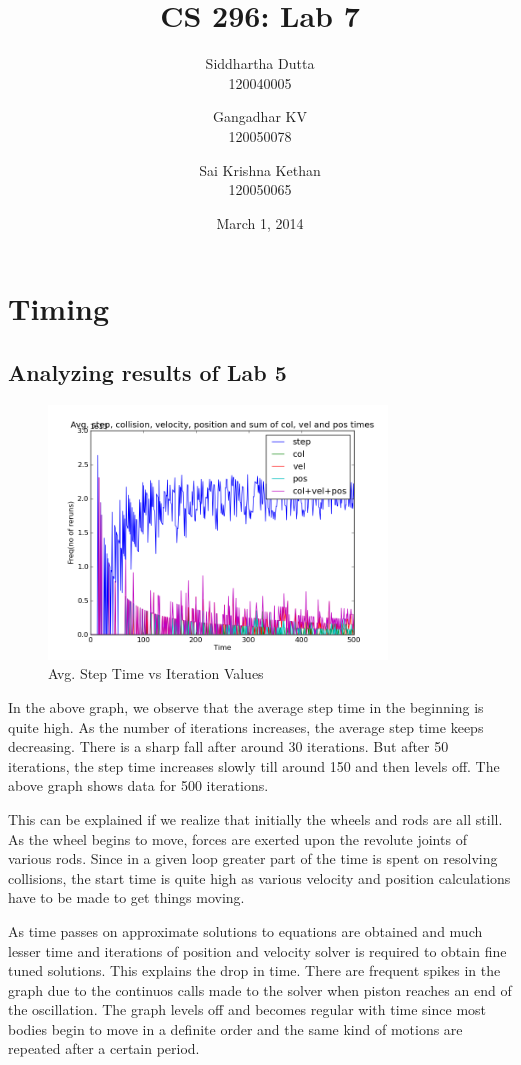 \documentclass[11pt]{article}
\title{\textbf{CS 296: Lab 7}}
\author{Siddhartha Dutta \\ 120040005 \and Gangadhar KV \\ 120050078 \and Sai Krishna Kethan \\ 120050065}
\date{March 1, 2014}
\begin{document}
\maketitle

\section{Timing}
\subsection{Analyzing results of Lab 5}

\begin{figure}[ht!]
\centering
\includegraphics[width=90mm]{g32_plot02.png}
\caption{Avg. Step Time vs Iteration Values}
\label{overflow}
\end{figure}

In the above graph, we observe that the average step time in the beginning is quite high. As the number of iterations increases, the average step time keeps decreasing. There is a sharp fall after around 30 iterations. But after 50 iterations, the step time increases slowly till around 150 and then levels off. The above graph shows data for 500 iterations. 

This can be explained if we realize that initially the wheels and rods are all still. As the wheel begins to move, forces are exerted upon the revolute joints of various rods. Since in a given loop greater part of the time is spent on resolving collisions, the start time is quite high as various velocity and position calculations have to be made to get things moving. 

As time passes on approximate solutions to equations are obtained and much lesser time and iterations of position and velocity solver is required to obtain fine tuned solutions. This explains the drop in time. There are frequent spikes in the graph due to the continuos calls made to the solver when piston reaches an end of the oscillation. The graph levels off and becomes regular with time since most bodies begin to move in a definite order and the same kind of motions are repeated after a certain period.
\end{document}
